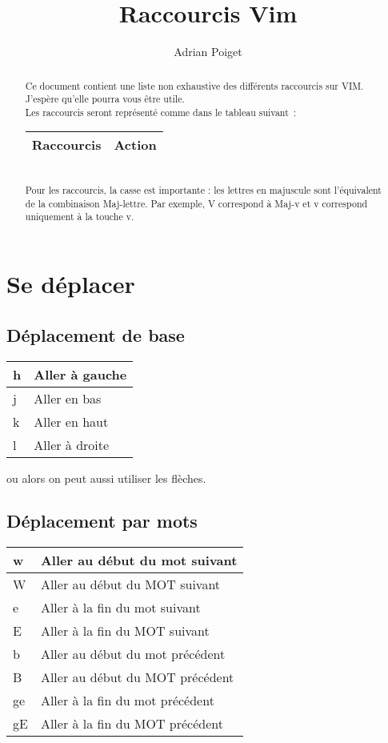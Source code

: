 \documentclass{article}
\title{Raccourcis Vim}
\author{Adrian Poiget}
\begin{document}
\maketitle
\begin{abstract}
Ce document contient une liste non exhaustive des différents raccourcis sur VIM.
J'espère qu'elle pourra vous être utile.\\
Les raccourcis seront représenté comme dans le tableau suivant~:
\begin{tabular}{|p{3cm}| l| }
\hline
Raccourcis & Action\\ \hline
\end{tabular}\\
Pour les raccourcis, la casse est importante : les lettres en majuscule sont l'équivalent de la combinaison Maj-lettre. Par exemple, V correspond à Maj-v et v correspond uniquement à la touche v.
\end{abstract}

\tableofcontents
\newpage

\section{Se déplacer}
\subsection{Déplacement de base}
\begin{tabular}{|p{3cm}| l| }
\hline
h & Aller à gauche \\ \hline
j & Aller en bas \\ \hline
k & Aller en haut \\ \hline
l & Aller à droite \\ \hline
\end{tabular}
ou alors on peut aussi utiliser les flèches.

\subsection{Déplacement par mots}
\begin{tabular}{|p{3cm}| l| }
\hline
w & Aller au début du mot suivant\\ \hline
W & Aller au début du MOT suivant\\ \hline
e & Aller à la fin du mot suivant\\ \hline
E & Aller à la fin du MOT suivant\\ \hline
b & Aller au début du mot précédent\\ \hline
B & Aller au début du MOT précédent\\ \hline
    ge & Aller à la fin du mot précédent\\ \hline
gE & Aller à la fin du MOT précédent\\ \hline
\end{tabular}\\
\end{document}
